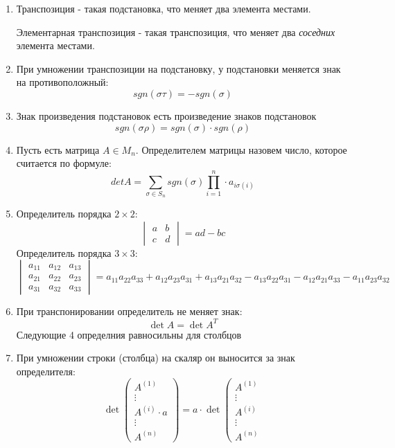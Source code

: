 \documentclass[a4paper,12pt]{article}
\begin{document}
\begin{enumerate}
		\item Транспозиция - такая подстановка, что меняет два элемента местами.
		
		Элементарная транспозиция - такая транспозиция, что меняет два \textit{соседних} элемента местами.
		
		\item При умножении транспозиции на подстановку, у подстановки меняется знак на противоположный:
		\[
			sgn(\sigma \tau) = -sgn(\sigma)
		\]
		
		\item Знак произведения подстановок есть произведение знаков подстановок
		\[
			sgn(\sigma \rho) = sgn(\sigma) \cdot sgn(\rho)
		\]
		
		\item Пусть есть матрица $A \in M_n$. Определителем матрицы назовем число, которое считается по формуле:
		\[
		detA = \sum_{\sigma \in S_n} sgn(\sigma) \prod_{i = 1}^n\cdot a_{i\sigma(i)}
		\]
		\item Определитель порядка $2 \times 2$:
		\[
		\begin{vmatrix}
		a & b \\
		c & d
		\end{vmatrix}
		= ad - bc
		\]
		Определитель порядка $3 \times 3$:
		\[
		\begin{vmatrix}
		a_{11} & a_{12} & a_{13} \\
		a_{21} & a_{22} & a_{23} \\
		a_{31} & a_{32} & a_{33}
		\end{vmatrix}
		= 
		a_{11}a_{22}a_{33} + a_{12}a_{23}a_{31} + a_{13}a_{21}a_{32} - a_{13}a_{22}a_{31} - a_{12}a_{21}a_{33} - a_{11}a_{23}a_{32}
		\]
		
		\item При транспонировании определитель не меняет знак:
		\[
		\det A = \det A^T
		\]
		Следующие 4 определния равносильны для столбцов
		\item При умножении строки (столбца) на скаляр он выносится за знак определителя:
		\[
		\det\left(
		\begin{matrix}
		A^{(1)}\\
		\vdots\\
		A^{(i)} \cdot a\\
		\vdots\\
		A^{(n)}
		
		\end{matrix}
		\right)
		=
		a \cdot \det\left(
		\begin{matrix}
		A^{(1)}\\
		\vdots\\
		A^{(i)}\\
		\vdots\\
		A^{(n)}
		

\end{matrix}\]
\end{enumerate}
\end{document}
